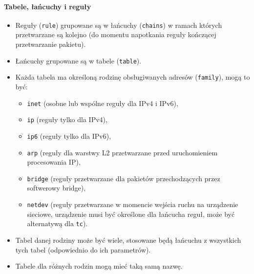 \documentclass{pdfBooklets}
\begin{document}
\paragraph{Tabele, łańcuchy i reguły}
\begin{itemize}
	\item Reguły (\Verb#rule#) grupowane są w łańcuchy (\Verb#chains#) w ramach których przetwarzane są kolejno (do momentu napotkania reguły kończącej przetwarzanie pakietu).
	\item Łańcuchy grupowane są w tabele (\Verb#table#).
	\item Każda tabela ma określoną rodzinę obsługiwanych adresów (\Verb#family#), mogą to być:
	\begin{itemize}
		\item \Verb#inet#   (osobne lub wspólne reguły dla IPv4 i IPv6),
			\item \Verb#ip#  (reguły tylko dla IPv4),
			\item \Verb#ip6# (reguły tylko dla IPv6),
		\item \Verb#arp#    (reguły dla warstwy L2 przetwarzane przed uruchomieniem procesowania IP),
		\item \Verb#bridge# (reguły przetwarzane dla pakietów przechodzących przez softwerowy bridge),
		\item \Verb#netdev# (reguły przetwarzane w momencie wejścia ruchu na urządzenie sieciowe, urządzenie musi być określone dla łańcucha reguł, może być alternatywą dla \Verb#tc#).
	\end{itemize}
	\item Tabel danej rodziny może być wiele, stosowane będą łańcuchu z wszystkich tych tabel (odpowiednio do ich parametrów).
	\item Tabele dla różnych rodzin mogą mieć taką samą nazwę.
\end{itemize}
\end{document}
